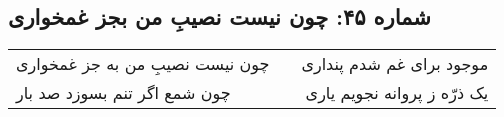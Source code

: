 \begin{center}
\section*{شماره ۴۵: چون نیست نصیبِ من بجز غمخواری}
\label{sec:045}
\begin{longtable}{l p{0.5cm} r}
چون نیست نصیبِ من به جز غمخواری
&&
موجود برای غم شدم پنداری
\\
چون شمع اگر تنم بسوزد صد بار
&&
یک ذرّه ز پروانه نجویم یاری
\\
\end{longtable}
\end{center}
